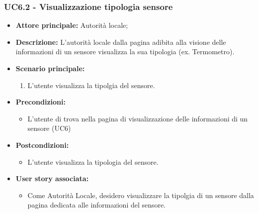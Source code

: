 \subsubsection{UC6.2 - Visualizzazione tipologia sensore}
\begin{itemize}
    \item \textbf{Attore principale:} Autorità locale;
    \item \textbf{Descrizione:} L’autorità locale dalla pagina adibita alla visione delle informazioni di un sensore visualizza la sua tipologia (ex. Termometro).
    \item \textbf{Scenario principale:}
          \begin{enumerate}
              \item L'utente visualizza la tipolgia del sensore.
          \end{enumerate}
    \item \textbf{Precondizioni:}
          \begin{itemize}
              \item  L'utente di trova nella pagina di visualizzazione delle informazioni di un sensore (UC6)
          \end{itemize}
    \item \textbf{Postcondizioni:}
          \begin{itemize}
              \item  L'utente visualizza la tipologia del sensore.
          \end{itemize}\item \textbf{User story associata:}
          \begin{itemize}
              \item Come Autorità Locale, desidero visualizzare la tipolgia di un sensore dalla pagina dedicata alle informazioni del sensore.
          \end{itemize}
\end{itemize}